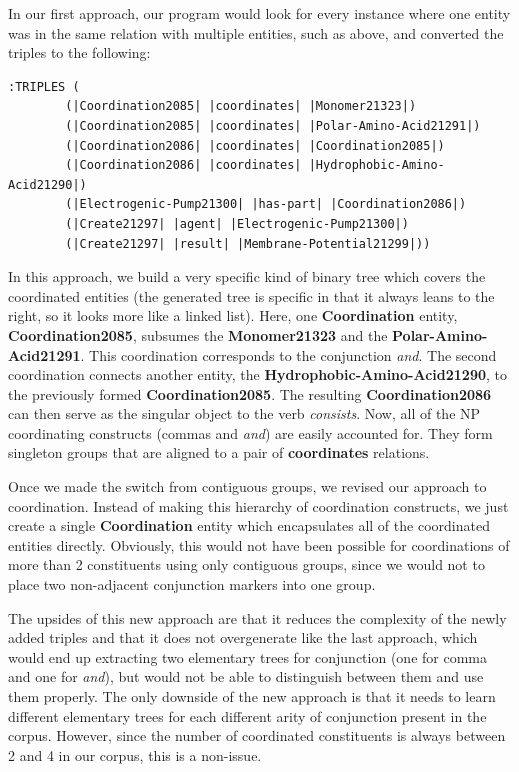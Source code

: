 \documentclass[a4paper]{article}
\begin{document}
In our first approach, our program would look for every instance where
one entity was in the same relation with multiple entities, such as
above, and converted the triples to the following:

\begin{verbatim}
:TRIPLES (
        (|Coordination2085| |coordinates| |Monomer21323|)
        (|Coordination2085| |coordinates| |Polar-Amino-Acid21291|)
        (|Coordination2086| |coordinates| |Coordination2085|)
        (|Coordination2086| |coordinates| |Hydrophobic-Amino-Acid21290|)
        (|Electrogenic-Pump21300| |has-part| |Coordination2086|)
        (|Create21297| |agent| |Electrogenic-Pump21300|)
        (|Create21297| |result| |Membrane-Potential21299|))
\end{verbatim}

In this approach, we build a very specific kind of binary tree which
covers the coordinated entities (the generated tree is specific in
that it always leans to the right, so it looks more like a linked
list). Here, one \textbf{Coordination} entity,
\textbf{Coordination2085}, subsumes the \textbf{Monomer21323} and the
\textbf{Polar-Amino-Acid21291}. This coordination corresponds to the
conjunction \emph{and}. The second coordination connects another
entity, the \textbf{Hydrophobic-Amino-Acid21290}, to the previously
formed \textbf{Coordination2085}. The resulting
\textbf{Coordination2086} can then serve as the singular object to the
verb \emph{consists}. Now, all of the NP coordinating constructs
(commas and \emph{and}) are easily accounted for. They form singleton
groups that are aligned to a pair of \textbf{coordinates} relations.

Once we made the switch from contiguous groups, we revised our
approach to coordination. Instead of making this hierarchy of
coordination constructs, we just create a single \textbf{Coordination}
entity which encapsulates all of the coordinated entities directly.
Obviously, this would not have been possible for coordinations of more
than 2 constituents using only contiguous groups, since we would not
to place two non-adjacent conjunction markers into one group.

The upsides of this new approach are that it reduces the complexity of
the newly added triples and that it does not overgenerate like the
last approach, which would end up extracting two elementary trees for
conjunction (one for comma and one for \emph{and}), but would not be
able to distinguish between them and use them properly. The only
downside of the new approach is that it needs to learn different
elementary trees for each different arity of conjunction present in
the corpus. However, since the number of coordinated constituents is
always between 2 and 4 in our corpus, this is a non-issue.
\end{document}
